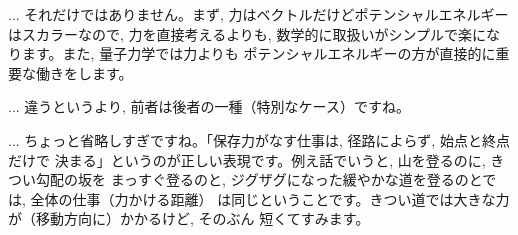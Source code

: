 \begin{faq}{\small{} ... 
それだけではありません。まず, 力はベクトルだけどポテンシャルエネルギーはスカラーなので, 
力を直接考えるよりも, 数学的に取扱いがシンプルで楽になります。また, 量子力学では力よりも
ポテンシャルエネルギーの方が直接的に重要な働きをします。}\end{faq}\mv

\begin{faq}{\small{} ... 違うというより, 
前者は後者の一種（特別なケース）ですね。}\end{faq}\mv

\begin{faq}{\small{} ... 
ちょっと省略しすぎですね。「保存力がなす仕事は, 径路によらず, 始点と終点だけで
決まる」というのが正しい表現です。例え話でいうと, 山を登るのに, きつい勾配の坂を
まっすぐ登るのと, ジグザグになった緩やかな道を登るのとでは, 全体の仕事（力かける距離）
は同じということです。きつい道では大きな力が（移動方向に）かかるけど, そのぶん
短くてすみます。}\end{faq}\mv


